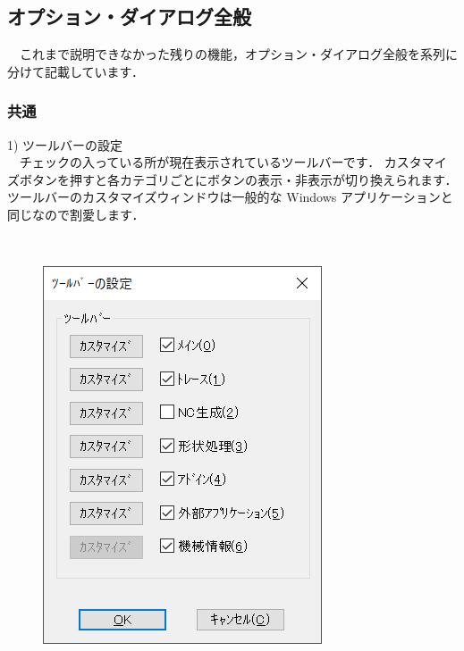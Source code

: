 
\subsection{オプション・ダイアログ全般}
　これまで説明できなかった残りの機能，オプション・ダイアログ全般を系列に分けて記載しています．

\subsubsection{共通}

\begin{minipage}[t]{0.58\textwidth}
1) ツールバーの設定\label{sec:toolbar}\\
　チェックの入っている所が現在表示されているツールバーです．
カスタマイズボタンを押すと各カテゴリごとにボタンの表示・非表示が切り換えられます．
ツールバーのカスタマイズウィンドウは一般的な Windows アプリケーションと同じなので割愛します．
\end{minipage}
\begin{minipage}[t]{0.02\textwidth}
　
\end{minipage}
\begin{minipage}[t]{0.4\textwidth}
\vspace*{-2zh}
\begin{figure}[H]
\centering
\includegraphics[width=\textwidth]{No6/fig/toolbar.png}
\label{fig:toolbar.png}
\end{figure}
\end{minipage}

